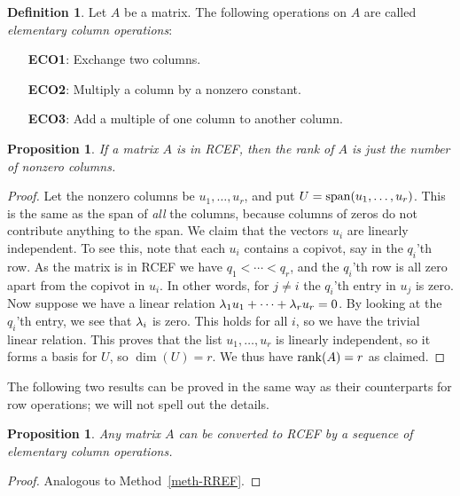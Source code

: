 \documentclass[reqno]{amsart}
\newtheorem{proposition}[theorem]{Proposition}
\theoremstyle{definition}
\newtheorem{definition}[theorem]{Definition}
\begin{document}
\begin{definition}\label{defn-ECO}
 Let $A$ be a matrix.  The following operations on $A$ are called
 \emph{elementary column operations}:
 \begin{itemize}
  \item[\textbf{ECO1}:] Exchange two columns.
  \item[\textbf{ECO2}:] Multiply a column by a nonzero constant.
  \item[\textbf{ECO3}:] Add a multiple of one column to another column.
 \end{itemize}
\end{definition}

\begin{proposition}\label{prop-rank-rcef}
 If a matrix $A$ is in RCEF, then the rank of $A$ is just the number
 of nonzero columns.
\end{proposition}
\begin{proof}
 Let the nonzero columns be $u_1,\dotsc,u_r$, and put
 $U=\operatorname{span}(u_1,\dotsc,u_r)$.  This is the same as the span of \emph{all}
 the columns, because columns of zeros do not contribute anything to
 the span.  We claim that the vectors $u_i$ are linearly independent.
 To see this, note that each $u_i$ contains a copivot, say in the
 $q_i$'th row.  As the matrix is in RCEF we have $q_1<\dotsb<q_r$, and
 the $q_i$'th row is all zero apart from the copivot in $u_i$.  In
 other words, for $j\neq i$ the $q_i$'th entry in $u_j$ is zero.  Now
 suppose we have a linear relation $\lambda_1u_1+\dotsb+\lambda_ru_r=0$.  By
 looking at the $q_i$'th entry, we see that $\lambda_i$ is zero.  This
 holds for all $i$, so we have the trivial linear relation.  This
 proves that the list $u_1,\dotsc,u_r$ is linearly independent, so it
 forms a basis for $U$, so $\dim(U)=r$.  We thus have $\operatorname{rank}(A)=r$ as
 claimed. 
\end{proof}

The following two results can be proved in the same way as their
counterparts for row operations; we will not spell out the details.
\begin{proposition}\label{prop-RCEF}
 Any matrix $A$ can be converted to RCEF by a sequence of elementary
 column operations.
\end{proposition}
\begin{proof}
 Analogous to Method~\ref{meth-RREF}.
\end{proof}
\end{document}
